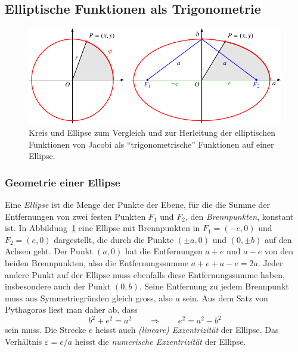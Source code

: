 %
%
%

%
%
\subsection{Elliptische Funktionen als Trigonometrie}
\begin{figure}
\centering
\includegraphics{chapters/110-elliptisch/images/ellipse.pdf}
\caption{Kreis und Ellipse zum Vergleich und zur Herleitung der 
elliptischen Funktionen von Jacobi als ``trigonometrische'' Funktionen
auf einer Ellipse.
\label{buch:elliptisch:fig:ellipse}}
\end{figure}

%
%
\subsubsection{Geometrie einer Ellipse}
Eine {\em Ellipse} ist die Menge der Punkte der Ebene, für die die Summe
%
der Entfernungen von zwei festen Punkten $F_1$ und $F_2$,
den {\em Brennpunkten}, konstant ist.
%
In Abbildung~\ref{buch:elliptisch:fig:ellipse} eine Ellipse
mit Brennpunkten in $F_1=(-e,0)$ und $F_2=(e,0)$ dargestellt,
die durch die Punkte $(\pm a,0)$ und $(0,\pm b)$ auf den Achsen geht.
Der Punkt $(a,0)$ hat die Entfernungen $a+e$ und $a-e$ von den beiden
Brennpunkten, also die Entfernungssumme $a+e+a-e=2a$.
Jeder andere Punkt auf der Ellipse muss ebenfalls diese Entfernungssumme
haben, insbesondere auch der Punkt $(0,b)$.
Seine Entfernung zu jedem Brennpunkt muss aus Symmetriegründen gleich gross,
also $a$ sein.
Aus dem Satz von Pythagoras liest man daher ab, dass
\[
b^2+e^2=a^2
\qquad\Rightarrow\qquad
e^2 = a^2-b^2
\]
sein muss.
Die Strecke $e$ heisst auch {\em (lineare) Exzentrizität} der Ellipse.
Das Verhältnis $\varepsilon= e/a$  heisst die {\em numerische Exzentrizität}
der Ellipse.

